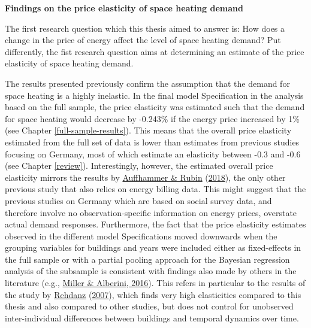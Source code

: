 \documentclass[12pt,twoside]{reedthesis}
\begin{document}
\textbf{Findings on the price elasticity of space heating demand}

The first research question which this thesis aimed to answer is: How does a change in the price of energy affect the level of space heating demand? Put differently, the fist research question aims at determining an estimate of the price elasticity of space heating demand.

The results presented previously confirm the assumption that the demand for space heating is a highly inelastic. In the final model Specification in the analysis based on the full sample, the price elasticity was estimated such that the demand for space heating would decrease by -0.243\% if the energy price increased by 1\% (see Chapter \ref{full-sample-results}). This means that the overall price elasticity estimated from the full set of data is lower than estimates from previous studies focusing on Germany, most of which estimate an elasticity between -0.3 and -0.6 (see Chapter \ref{review}). Interestingly, however, the estimated overall price elasticity mirrors the results by \protect\hyperlink{ref-auffhammer_rubin18}{Auffhammer \& Rubin} (\protect\hyperlink{ref-auffhammer_rubin18}{2018}), the only other previous study that also relies on energy billing data. This might suggest that the previous studies on Germany which are based on social survey data, and therefore involve no observation-specific information on energy prices, overstate actual demand responses. Furthermore, the fact that the price elasticity estimates observed in the different model Specifications moved downwards when the grouping variables for buildings and years were included either as fixed-effects in the full sample or with a partial pooling approach for the Bayesian regression analysis of the subsample is consistent with findings also made by others in the literature (e.g., \protect\hyperlink{ref-miller_alberini16}{Miller \& Alberini, 2016}). This refers in particular to the results of the study by \protect\hyperlink{ref-rehdanz07}{Rehdanz} (\protect\hyperlink{ref-rehdanz07}{2007}), which finds very high elasticities compared to this thesis and also compared to other studies, but does not control for unobserved inter-individual differences between buildings and temporal dynamics over time.
\end{document}
